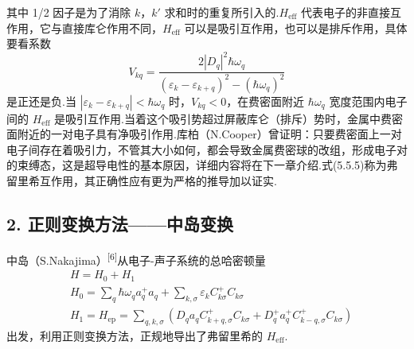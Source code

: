 其中 1/2 因子是为了消除 $k$，$k'$ 求和时的重复所引入的.$H_{\mathrm{eff}}$ 代表电子的非直接互作用，它与直接库仑作用不同，$H_{\mathrm{eff}}$ 可以是吸引互作用，也可以是排斥作用，具体要看系数
\begin{equation}
  V_{kq}=\frac{2\left|D_q\right|^2\hbar\omega_q}
  {\left(\varepsilon_k-\varepsilon_{k+q}\right)^2-\left(\hbar\omega_q\right)^2}
\end{equation}
是正还是负.当 $\left|\varepsilon_k-\varepsilon_{k+q}\right|<\hbar\omega_q$ 时，$V_{kq}<0$，在费密面附近 $\hbar\omega_q$ 宽度范围内电子间的 $H_{\mathrm{eff}}$ 是吸引互作用.当着这个吸引势超过屏蔽库仑（排斥）势时，金属中费密面附近的一对电子具有净吸引作用.库柏（N.Cooper）曾证明：只要费密面上一对电子间存在着吸引力，不管其大小如何，都会导致金属费密球的改组，形成电子对的束缚态，这是超导电性的基本原因，详细内容将在下一章介绍.式(5.5.5)称为弗留里希互作用，其正确性应有更为严格的推导加以证实.

\subsection*{2. 正则变换方法——中岛变换}

中岛（S.Nakajima）\textsuperscript{[6]}从电子-声子系统的总哈密顿量
\begin{equation}
\begin{aligned}
  &H=H_0+H_1\\
  &H_0=\sum_{q}\hbar\omega_qa_q^{+}a_q+\sum_{k,\sigma}\varepsilon_kC_{k\sigma}^{+}C_{k\sigma}\\
  &H_1=H_{\mathrm{ep}}=\sum_{q,k,\sigma}\left(D_qa_qC_{k+q,\sigma}^{+}C_{k\sigma}
  +D_q^{+}a_q^{+}C_{k-q,\sigma}^{+}C_{k\sigma}\right)
\end{aligned}
\end{equation}
出发，利用正则变换方法，正规地导出了弗留里希的 $H_{\mathrm{eff}}$.

